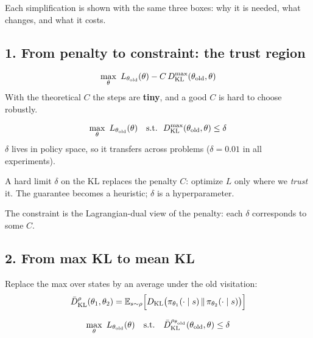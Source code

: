 Each simplification is shown with the same three boxes: why it is needed, what changes, and what it costs.

\subsection{1. From penalty to constraint: the trust region}

\begin{pair}
\begin{warmbox}[title={Theory (penalty)}]
\begin{gather*}
  \max_\theta\ L_{\theta_{\mathrm{old}}}(\theta) - C\,D_{\mathrm{KL}}^{\max}(\theta_{\mathrm{old}},\theta)
\end{gather*}
With the theoretical $C$ the steps are \textbf{tiny}, and a good $C$ is hard to choose robustly.
\end{warmbox}
\begin{coolbox}[title={Practice (constraint)}]
\begin{gather*}
  \max_\theta\ L_{\told}(\theta) \quad \text{s.t.}\ \ \DKL^{\max}(\told,\theta) \le \delta
\end{gather*}
$\delta$ lives in policy space, so it transfers across problems ($\delta=0.01$ in all experiments).
\end{coolbox}
\end{pair}

     {A hard limit $\delta$ on the KL replaces the penalty $C$: optimize $L$ only where we \emph{trust} it.}
     {The guarantee becomes a heuristic; $\delta$ is a hyperparameter.}

{\small The constraint is the Lagrangian-dual view of the penalty: each $\delta$ corresponds to some $C$.}

\subsection{2. From max KL to mean KL}

Replace the max over states by an average under the old visitation:
\begin{gather*}
  \bar D_{\mathrm{KL}}^{\rho}(\theta_1,\theta_2) = \mathbb{E}_{s\sim\rho}\Big[D_{\mathrm{KL}}\big(\pi_{\theta_1}(\cdot\mid s)\,\|\,\pi_{\theta_2}(\cdot\mid s)\big)\Big]
\end{gather*}
\begin{eqbox}
\begin{gather*}
  \max_\theta\ L_{\theta_{\mathrm{old}}}(\theta) \quad\text{s.t.}\quad \bar D_{\mathrm{KL}}^{\rho_{\theta_{\mathrm{old}}}}(\theta_{\mathrm{old}},\theta) \le \delta
\end{gather*}
\end{eqbox}

